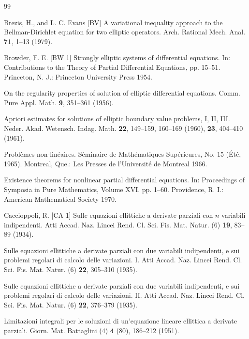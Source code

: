 \begin{thebibliography}{99}

Brezis, H., and L. C. Evans
[BV] \quad A variational inequality approach to the Bellman-Dirichlet equation for two elliptic
operators. Arch. Rational Mech. Anal. \textbf{71}, 1--13 (1979).

Browder, F. E.
[BW 1] \quad Strongly elliptic systems of differential equations. In: Contributions to the Theory of Partial
Differential Equations, pp. 15--51. Princeton, N. J.: Princeton University Press 1954.

\quad On the regularity properties of solution of elliptic differential equations. Comm. Pure Appl.
Math. \textbf{9}, 351--361 (1956).

\quad Apriori estimates for solutions of elliptic boundary value problems, I, II, III. Neder. Akad.
Wetensch. Indag. Math. \textbf{22}, 149--159, 160--169 (1960), \textbf{23}, 404--410 (1961).

\quad Probl\`emes non-lin\'eaires. S\'eminaire de Math\'ematiques Sup\'erieures, No. 15 (\'Et\'e, 1965).
Montreal, Que.: Les Presses de l'Universit\'e de Montreal 1966.

\quad Existence theorems for nonlinear partial differential equations. In: Proceedings of Symposia
in Pure Mathematics, Volume XVI. pp. 1--60. Providence, R. I.: American Mathematical
Society 1970.

Caccioppoli, R.
[CA 1] \quad Sulle equazioni ellittiche a derivate parziali con $n$ variabili indipendenti. Atti Accad.
Naz. Lincei Rend. Cl. Sci. Fis. Mat. Natur. (6) \textbf{19}, 83--89 (1934).

\quad Sulle equazioni ellittiche a derivate parziali con due variabili indipendenti, e sui problemi
regolari di calcolo delle variazioni. I. Atti Accad. Naz. Lincei Rend. Cl. Sci. Fis. Mat.
Natur. (6) \textbf{22}, 305--310 (1935).

\quad Sulle equazioni ellittiche a derivate parziali con due variabili indipendenti, e sui problemi
regolari di calcolo delle variazioni. II. Atti Accad. Naz. Lincei Rend. Cl. Sci. Fis. Mat.
Natur. (6) \textbf{22}, 376--379 (1935).

\quad Limitazioni integrali per le soluzioni di un'equazione lineare ellittica a derivate parziali.
Giorn. Mat. Battaglini (4) \textbf{4} (80), 186--212 (1951).


\end{thebibliography}
